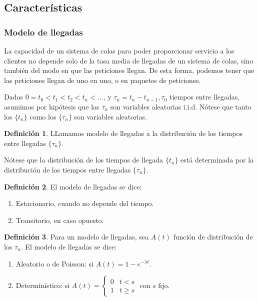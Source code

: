 \documentclass[a4paper,10pt]{scrartcl}
\theoremstyle{definition}
\newtheorem*{mydef}{Definición}
\numberwithin{equation}{section}
\begin{document}
	\subsection{Características}
	\subsubsection{Modelo de llegadas}
	La capacidad de un sistema de colas para poder proporcionar servicio a los clientes no depende solo de la tasa media
	de llegadas de un sistema de colas, sino también del modo en que las peticiones llegan. De esta forma, podemos
	tener que las peticiones llegan de uno en uno, o en paquetes de peticiones.
	
	Dados $0=t_0 < t_1 < t_2 < t_n < \ldots$, y $\tau_n = t_n - t_{n-1}, \tau_0$ tiempos entre llegadas, asumimos por hipótesis
	que las $\tau_n$ son variables aleatorias i.i.d. Nótese que tanto los $\{t_n\}$ como los $\{\tau_n\}$ son
	variables aleatorias.
	
	\begin{mydef}
		LLamamos modelo de llegadas a la distribución de los tiempos entre llegadas $\{\tau_n\}$.
	\end{mydef}
	
	Nótese que la distribución de los tiempos de llegada $\{t_n\}$ está determinada por la distribución de los tiempos entre
	llegadas $\{\tau_n\}$. 
	
	\begin{mydef}
		El modelo de llegadas se dice:
		
		\begin{enumerate}
			\item Estacionario, cuando no depende del tiempo.
			\item Transitorio, en caso opuesto.
		\end{enumerate}
	\end{mydef}
	
	
	\begin{mydef}
		Para un modelo de llegadas, sea $A(t)$ función de distribución de los $\tau_n$. 
		El modelo de llegadas se dice:
		
		\begin{enumerate}
			\item Aleatorio o de Poisson: si $A(t) = 1 - e^{-\lambda t}$.
			\item Determinístico: si $A(t) = \left\{\begin{array}{ll}
			0 & t<s \\
			1 & t\ge s
			\end{array}\right.$ con $s$ fijo.
			
		\end{enumerate}
	\end{mydef}
	
\end{document}
